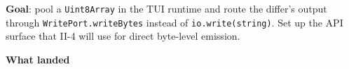 \textbf{Goal}: pool a \texttt{U\allowbreak{}i\allowbreak{}n\allowbreak{}t\allowbreak{}8\allowbreak{}A\allowbreak{}r\allowbreak{}r\allowbreak{}a\allowbreak{}y} in the TUI runtime and route the differ's output through \texttt{W\allowbreak{}r\allowbreak{}i\allowbreak{}t\allowbreak{}e\allowbreak{}P\allowbreak{}o\allowbreak{}r\allowbreak{}t\allowbreak{}.\allowbreak{}w\allowbreak{}r\allowbreak{}i\allowbreak{}t\allowbreak{}e\allowbreak{}B\allowbreak{}y\allowbreak{}t\allowbreak{}e\allowbreak{}s} instead of \texttt{i\allowbreak{}o\allowbreak{}.\allowbreak{}w\allowbreak{}r\allowbreak{}i\allowbreak{}t\allowbreak{}e\allowbreak{}(\allowbreak{}s\allowbreak{}t\allowbreak{}r\allowbreak{}i\allowbreak{}n\allowbreak{}g\allowbreak{})}. Set up the API surface that II-4 will use for direct byte-level emission.

\textbf{What landed}

